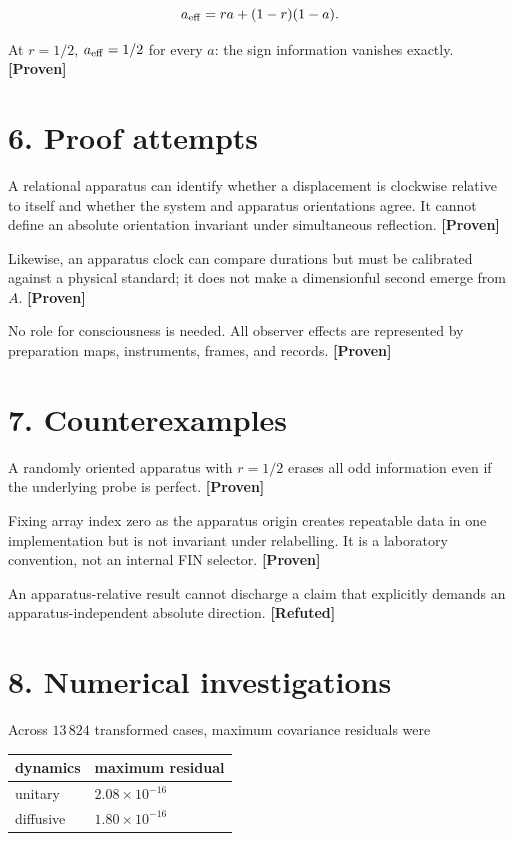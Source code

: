 \documentclass[11pt,a4paper,openany]{report}
\newcommand{\statusProven}{\textcolor{fingreen}{[Proven]}}
\newcommand{\statusRefuted}{\textcolor{finred}{[Refuted]}}
\begin{document}
\[
a_{\rm eff}=ra+(1-r)(1-a).
\]

At \(r=1/2\), \(a_{\rm eff}=1/2\) for every \(a\): the sign information vanishes exactly. \textbf{\statusProven{}}

\section{6. Proof attempts}

A relational apparatus can identify whether a displacement is clockwise relative to itself and whether the system and apparatus orientations agree. It cannot define an absolute orientation invariant under simultaneous reflection. \textbf{\statusProven{}}

Likewise, an apparatus clock can compare durations but must be calibrated against a physical standard; it does not make a dimensionful second emerge from \(A\). \textbf{\statusProven{}}

No role for consciousness is needed. All observer effects are represented by preparation maps, instruments, frames, and records. \textbf{\statusProven{}}

\section{7. Counterexamples}

A randomly oriented apparatus with \(r=1/2\) erases all odd information even if the underlying probe is perfect. \textbf{\statusProven{}}

Fixing array index zero as the apparatus origin creates repeatable data in one implementation but is not invariant under relabelling. It is a laboratory convention, not an internal FIN selector. \textbf{\statusProven{}}

An apparatus-relative result cannot discharge a claim that explicitly demands an apparatus-independent absolute direction. \textbf{\statusRefuted{}}

\section{8. Numerical investigations}

Across \(13\,824\) transformed cases, maximum covariance residuals were

\begin{center}
\begingroup\small
\setlength{\tabcolsep}{3.5pt}
\renewcommand{\arraystretch}{1.16}
\begin{longtable}{@{}p{}p{}@{}}
\toprule
\textbf{dynamics} & \textbf{maximum residual} \\
\midrule
\endhead
unitary & \(2.08\times10^{-16}\) \\
diffusive & \(1.80\times10^{-16}\) \\
\bottomrule
\end{longtable}
\endgroup
\end{center}
\end{document}
